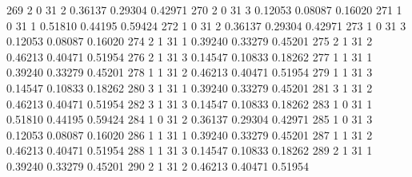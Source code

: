 \documentclass{article}
\begin{document}
\begin{Woutput}
 269      2       0      31       2       0.36137    0.29304    0.42971
 270      2       0      31       3       0.12053    0.08087    0.16020
 271      1       0      31       1       0.51810    0.44195    0.59424
 272      1       0      31       2       0.36137    0.29304    0.42971
 273      1       0      31       3       0.12053    0.08087    0.16020
 274      2       1      31       1       0.39240    0.33279    0.45201
 275      2       1      31       2       0.46213    0.40471    0.51954
 276      2       1      31       3       0.14547    0.10833    0.18262
 277      1       1      31       1       0.39240    0.33279    0.45201
 278      1       1      31       2       0.46213    0.40471    0.51954
 279      1       1      31       3       0.14547    0.10833    0.18262
 280      3       1      31       1       0.39240    0.33279    0.45201
 281      3       1      31       2       0.46213    0.40471    0.51954
 282      3       1      31       3       0.14547    0.10833    0.18262
 283      1       0      31       1       0.51810    0.44195    0.59424
 284      1       0      31       2       0.36137    0.29304    0.42971
 285      1       0      31       3       0.12053    0.08087    0.16020
 286      1       1      31       1       0.39240    0.33279    0.45201
 287      1       1      31       2       0.46213    0.40471    0.51954
 288      1       1      31       3       0.14547    0.10833    0.18262
 289      2       1      31       1       0.39240    0.33279    0.45201
 290      2       1      31       2       0.46213    0.40471    0.51954


\end{Woutput}
\end{document}
